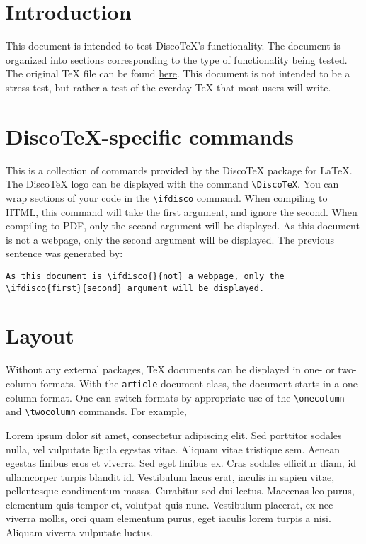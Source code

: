 \documentclass[11pt]{article}
\newcommand{\DiscoTeX}[0]{Disco\TeX}
\newcommand{\ifdisco}[2]{#2}
\begin{document}
\tableofcontents

\section{Introduction}

This document is intended to test \DiscoTeX's functionality.
The document is organized into sections corresponding to the type of functionality being tested.
The original \TeX{} file can be found \href{test.html}{here}.
This document is not intended to be a stress-test, but rather a test of the everday-\TeX{} that most users will write.

\section{\DiscoTeX-specific commands}
This is a collection of commands provided by the \DiscoTeX{} package for \LaTeX{}.
The \DiscoTeX{} logo can be displayed with the command \verb|\DiscoTeX|.
You can wrap sections of your code in the \verb|\ifdisco| command.
When compiling to HTML, this command will take the first argument, and ignore the second.
When compiling to PDF, only the second argument will be displayed.
As this document is \ifdisco{}{not} a webpage, only the \ifdisco{first}{second} argument will be displayed.
The previous sentence was generated by:
\begin{verbatim}
As this document is \ifdisco{}{not} a webpage, only the \ifdisco{first}{second} argument will be displayed.
\end{verbatim}

\section{Layout}
Without any external packages, \TeX{} documents can be displayed in one- or two-column formats.
With the \verb|article| document-class, the document starts in a one-column format.
One can switch formats by appropriate use of the \verb|\onecolumn| and \verb|\twocolumn| commands.
For example,

\twocolumn
Lorem ipsum dolor sit amet, consectetur adipiscing elit. Sed porttitor sodales nulla, vel vulputate ligula egestas vitae. Aliquam vitae tristique sem. Aenean egestas finibus eros et viverra. Sed eget finibus ex. Cras sodales efficitur diam, id ullamcorper turpis blandit id. Vestibulum lacus erat, iaculis in sapien vitae, pellentesque condimentum massa. Curabitur sed dui lectus. Maecenas leo purus, elementum quis tempor et, volutpat quis nunc. Vestibulum placerat, ex nec viverra mollis, orci quam elementum purus, eget iaculis lorem turpis a nisi. Aliquam viverra vulputate luctus.
\end{document}
